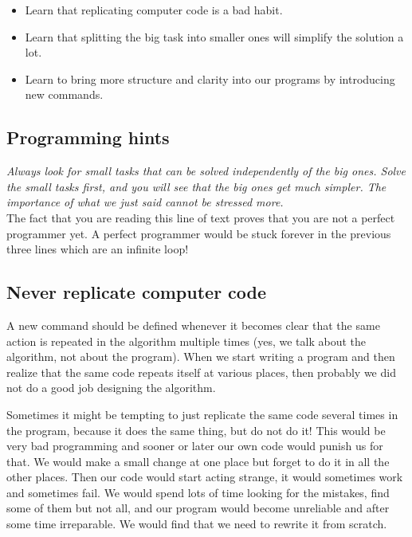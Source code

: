 \documentclass[article,A4,12pt]{llncs}
\begin{document}
\begin{itemize}
\item Learn that replicating computer code is a bad habit.
\item Learn that splitting the big task into smaller ones will simplify the solution a lot. 
\item Learn to bring more structure and clarity into our programs by introducing new commands.
\end{itemize}

\subsection{Programming hints}

{\em Always look for small tasks that can be solved independently of the big ones.
Solve the small tasks first, and you will see that the big ones get much simpler. The 
importance of what we just said cannot be stressed more.}\\

\noindent
The fact that you are reading this line of text proves that you are not 
a perfect programmer yet. A perfect programmer would be stuck forever 
in the previous three lines which are an infinite loop!


\subsection{Never replicate computer code}

A new command should be defined whenever it becomes clear that the same 
action is repeated in the algorithm multiple times (yes, we talk about the algorithm,
not about the program). When we start writing a program and then realize that the same
code repeats itself at various places, then probably we did not do a good job 
designing the algorithm.

Sometimes it might be 
tempting to just replicate the same code several times in the 
program, because it does the same thing, but do not do it! This would be very bad programming
and sooner or later our own code would punish us for that. 
We would make a small change at one place but forget to do it 
in all the other places. Then our code would start 
acting strange, it would sometimes work and sometimes fail. 
We would spend lots of time looking for the mistakes, find some 
of them but not all, and our program would become unreliable
and after some time irreparable. We would find that we need to 
rewrite it from scratch.
\end{document}
